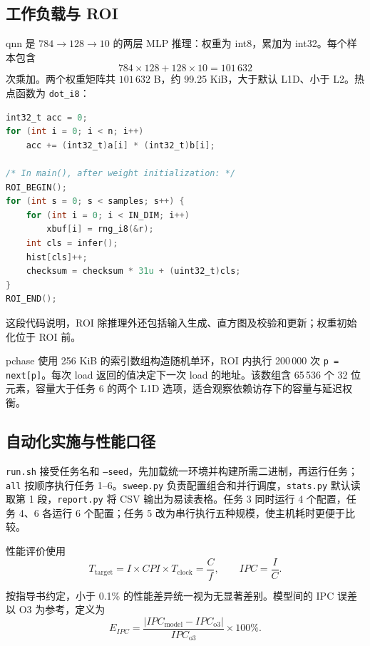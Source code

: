 \documentclass[12pt,a4paper,fontset=mac]{ctexart}
\begin{document}
\subsection{工作负载与 ROI}
qnn 是 $784\to128\to10$ 的两层 MLP 推理：权重为 int8，累加为 int32。每个样本包含
\[
784\times128+128\times10=101\,632
\]
次乘加。两个权重矩阵共 $101\,632$ B，约 99.25 KiB，大于默认 L1D、小于 L2。热点函数为 \texttt{dot\_i8}：
\begin{lstlisting}[language=C,caption={基线点积与推理测量区间的核心代码}]
int32_t acc = 0;
for (int i = 0; i < n; i++)
    acc += (int32_t)a[i] * (int32_t)b[i];

/* In main(), after weight initialization: */
ROI_BEGIN();
for (int s = 0; s < samples; s++) {
    for (int i = 0; i < IN_DIM; i++)
        xbuf[i] = rng_i8(&r);
    int cls = infer();
    hist[cls]++;
    checksum = checksum * 31u + (uint32_t)cls;
}
ROI_END();
\end{lstlisting}
这段代码说明，ROI 除推理外还包括输入生成、直方图及校验和更新；权重初始化位于 ROI 前。

pchase 使用 256 KiB 的索引数组构造随机单环，ROI 内执行 200\,000 次 \texttt{p = next[p]}。每次 load 返回的值决定下一次 load 的地址。该数组含 65\,536 个 32 位元素，容量大于任务 6 的两个 L1D 选项，适合观察依赖访存下的容量与延迟权衡。

\subsection{自动化实施与性能口径}
\texttt{run.sh} 接受任务名和 \texttt{--seed}，先加载统一环境并构建所需二进制，再运行任务；\texttt{all} 按顺序执行任务 1--6。\texttt{sweep.py} 负责配置组合和并行调度，\texttt{stats.py} 默认读取第 1 段，\texttt{report.py} 将 CSV 输出为易读表格。任务 3 同时运行 4 个配置，任务 4、6 各运行 6 个配置；任务 5 改为串行执行五种规模，使主机耗时更便于比较。

性能评价使用
\begin{equation}
T_{\mathrm{target}}=I\times CPI\times T_{\mathrm{clock}}
=\frac{C}{f},\qquad IPC=\frac{I}{C}.
\end{equation}

按指导书约定，小于 0.1\% 的性能差异统一视为无显著差别。模型间的 IPC 误差以 O3 为参考，定义为
\begin{equation}
E_{IPC}=\frac{|IPC_{\mathrm{model}}-IPC_{\mathrm{o3}}|}{IPC_{\mathrm{o3}}}\times100\%.
\end{equation}
\end{document}

